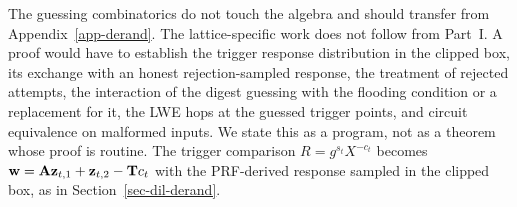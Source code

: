 The guessing combinatorics do not touch the algebra and should transfer from Appendix~\ref{app-derand}. The lattice-specific work does not follow from Part~I. A proof would have to establish the trigger response distribution in the clipped box, its exchange with an honest rejection-sampled response, the treatment of rejected attempts, the interaction of the digest guessing with the flooding condition or a replacement for it, the LWE hops at the guessed trigger points, and circuit equivalence on malformed inputs. We state this as a program, not as a theorem whose proof is routine. The trigger comparison $R = g^{s_t}X^{-c_t}$ becomes $\mathbf{w} = \mathbf{A}\mathbf{z}_{t,1} + \mathbf{z}_{t,2} - \mathbf{T}c_t$ with the PRF-derived response sampled in the clipped box, as in Section~\ref{sec-dil-derand}.

